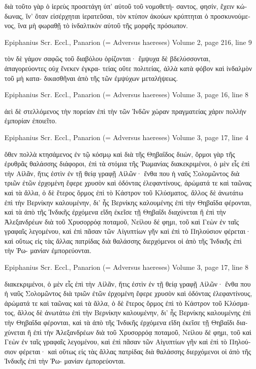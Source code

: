 \documentclass[12pt,letterpaper,twoside,final]{memoir}
\begin{document}
\begin{greek}
       διὰ τοῦτο γὰρ ὁ ἱερεὺς προσετάγη ὑπ' αὐτοῦ τοῦ νομοθετή-
σαντος, φησίν, ἔχειν κώδωνας, ἵν' ὅταν εἰσέρχηται ἱερατεῦσαι, τὸν 
κτύπον ἀκούων κρύπτηται ὁ προσκυνούμενος, ἵνα μὴ φωραθῇ τὸ 
ἰνδαλτικὸν αὐτοῦ τῆς μορφῆς πρόσωπον. 



Epiphanius Scr. Eccl., Panarion (= Adversus haereses) 
Volume 2, page 216, line 9

                                 τὸν δὲ γάμον σαφῶς τοῦ διαβόλου 
ὁρίζονται· ἔμψυχα δὲ βδελύσσονται, ἀπαγορεύοντες οὐχ ἕνεκεν ἐγκρα-
τείας οὔτε πολιτείας, ἀλλὰ κατὰ φόβον καὶ ἰνδαλμὸν τοῦ μὴ κατα-
δικασθῆναι ἀπὸ τῆς τῶν ἐμψύχων μεταλήψεως. 



Epiphanius Scr. Eccl., Panarion (= Adversus haereses) 
Volume 3, page 16, line 8

                                     ἀεὶ δὲ στελλόμενος τὴν πορείαν ἐπὶ 
τὴν τῶν Ἰνδῶν χώραν πραγματείας χάριν πολλὴν ἐμπορίαν ἐποιεῖτο. 



Epiphanius Scr. Eccl., Panarion (= Adversus haereses) 
Volume 3, page 17, line 4

                                                                             ὅθεν 
πολλὰ κτησάμενος ἐν τῷ κόσμῳ καὶ διὰ τῆς Θηβαΐδος διιών, ὅρμοι 
γὰρ τῆς ἐρυθρᾶς θαλάσσης διάφοροι, ἐπὶ τὰ στόμια τῆς Ῥωμανίας 
διακεκριμένοι, ὁ μὲν εἷς ἐπὶ τὴν Αἰλᾶν, ἥτις ἐστὶν ἐν τῇ θείᾳ γραφῇ 
Αἰλῶν· ἔνθα που ἡ ναῦς Σολομῶντος διὰ τριῶν ἐτῶν ἐρχομένη ἔφερε   
χρυσὸν καὶ ὀδόντας ἐλεφαντίνους, ἀρώματά τε καὶ ταῶνας καὶ τὰ ἄλλα, 
ὁ δὲ ἕτερος ὅρμος ἐπὶ τὸ Κάστρον τοῦ Κλύσματος, ἄλλος δὲ ἀνωτάτω 
ἐπὶ τὴν Βερνίκην καλουμένην, δι' ἧς Βερνίκης καλουμένης ἐπὶ τὴν Θηβαΐδα 
φέρονται, καὶ τὰ ἀπὸ τῆς Ἰνδικῆς ἐρχόμενα εἴδη ἐκεῖσε τῇ Θηβαΐδι 
διαχύνεται ἢ ἐπὶ τὴν Ἀλεξανδρέων διὰ τοῦ Χρυσορρόᾳ ποταμοῦ, Νείλου 
δέ φημι, τοῦ καὶ Γεὼν ἐν ταῖς γραφαῖς λεγομένου, καὶ ἐπὶ πᾶσαν τῶν 
Αἰγυπτίων γῆν καὶ ἐπὶ τὸ Πηλούσιον φέρεται· καὶ οὕτως εἰς τὰς ἄλλας 
πατρίδας διὰ θαλάσσης διερχόμενοι οἱ ἀπὸ τῆς Ἰνδικῆς ἐπὶ τὴν Ῥω-
μανίαν ἐμπορεύονται. 



Epiphanius Scr. Eccl., Panarion (= Adversus haereses) 
Volume 3, page 17, line 8

διακεκριμένοι, ὁ μὲν εἷς ἐπὶ τὴν Αἰλᾶν, ἥτις ἐστὶν ἐν τῇ θείᾳ γραφῇ 
Αἰλῶν· ἔνθα που ἡ ναῦς Σολομῶντος διὰ τριῶν ἐτῶν ἐρχομένη ἔφερε   
χρυσὸν καὶ ὀδόντας ἐλεφαντίνους, ἀρώματά τε καὶ ταῶνας καὶ τὰ ἄλλα, 
ὁ δὲ ἕτερος ὅρμος ἐπὶ τὸ Κάστρον τοῦ Κλύσματος, ἄλλος δὲ ἀνωτάτω 
ἐπὶ τὴν Βερνίκην καλουμένην, δι' ἧς Βερνίκης καλουμένης ἐπὶ τὴν Θηβαΐδα 
φέρονται, καὶ τὰ ἀπὸ τῆς Ἰνδικῆς ἐρχόμενα εἴδη ἐκεῖσε τῇ Θηβαΐδι 
διαχύνεται ἢ ἐπὶ τὴν Ἀλεξανδρέων διὰ τοῦ Χρυσορρόᾳ ποταμοῦ, Νείλου 
δέ φημι, τοῦ καὶ Γεὼν ἐν ταῖς γραφαῖς λεγομένου, καὶ ἐπὶ πᾶσαν τῶν 
Αἰγυπτίων γῆν καὶ ἐπὶ τὸ Πηλούσιον φέρεται· καὶ οὕτως εἰς τὰς ἄλλας 
πατρίδας διὰ θαλάσσης διερχόμενοι οἱ ἀπὸ τῆς Ἰνδικῆς ἐπὶ τὴν Ῥω-
μανίαν ἐμπορεύονται. 




\end{greek}
\end{document}
